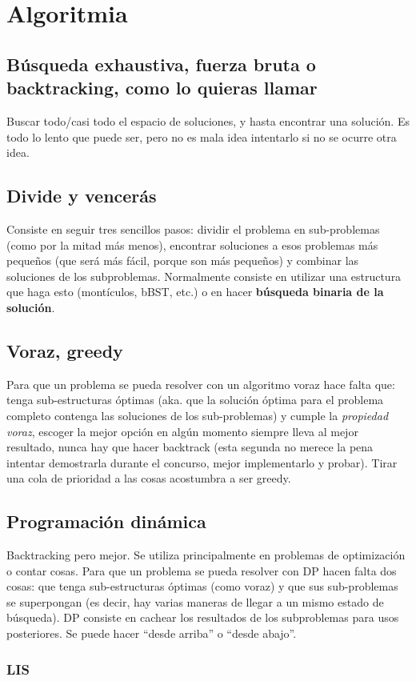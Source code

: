 \chapter{Algoritmia}

\section{Búsqueda exhaustiva, fuerza bruta o backtracking, como lo quieras llamar}
Buscar todo/casi todo el espacio de soluciones, y hasta encontrar una solución. Es todo lo lento
que puede ser, pero no es mala idea intentarlo si no se ocurre otra idea.

\section{Divide y vencerás}
Consiste en seguir tres sencillos pasos: dividir el problema en sub-problemas
(como por la mitad más menos), encontrar soluciones a esos problemas más
pequeños (que será más fácil, porque son más pequeños) y combinar las soluciones
de los subproblemas. Normalmente consiste en utilizar una estructura que haga esto
(montículos, bBST, etc.) o en hacer \textbf{búsqueda binaria de la solución}.


\section{Voraz, greedy}
Para que un problema se pueda resolver con un algoritmo voraz hace falta que:
tenga sub-estructuras óptimas (aka. que la solución óptima para el problema
completo contenga las soluciones de los sub-problemas) y cumple la
\textit{propiedad voraz}, escoger la mejor opción en algún momento siempre lleva
al mejor resultado, nunca hay que hacer backtrack (esta segunda no merece la
pena intentar demostrarla durante el concurso, mejor implementarlo y probar).
Tirar una cola de prioridad a las cosas acostumbra a ser greedy.


\section{Programación dinámica}
Backtracking pero mejor. Se utiliza principalmente en problemas de optimización
o contar cosas. Para que un problema se pueda resolver con DP hacen falta dos
cosas: que tenga sub-estructuras óptimas (como voraz) y que sus sub-problemas se
superpongan (es decir, hay varias maneras de llegar a un mismo estado de
búsqueda). DP consiste en cachear los resultados de los subproblemas para usos
posteriores. Se puede hacer \enquote{desde arriba} o \enquote{desde abajo}.


\subsection{LIS}
